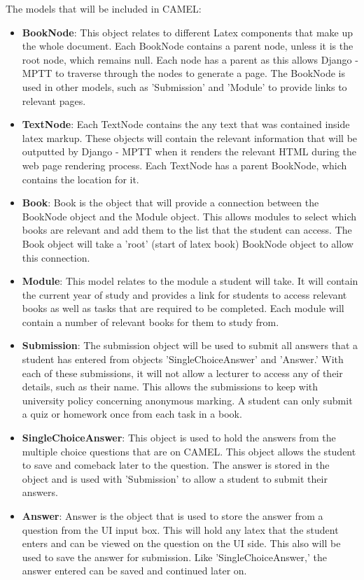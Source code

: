 	The models that will be included in CAMEL:
	\begin{itemize}
		\item \textbf{BookNode}: This object relates to different Latex components that make up the whole document. Each BookNode contains a parent node, unless it is the root node, which remains null. Each node has a parent as this allows Django - MPTT to traverse through the nodes to generate a page. The BookNode is used in other models, such as 'Submission' and 'Module' to provide links to relevant pages.     
		
		\item \textbf{TextNode}: Each TextNode contains the any text that was contained inside latex markup. These objects will contain the relevant information that will be outputted by Django - MPTT when it renders the relevant HTML during the web page rendering process. Each TextNode has a parent BookNode, which contains the location for it.  
		
		\item \textbf{Book}: Book is the object that will provide a connection between the BookNode object and the Module object. This allows modules to select which books are relevant and add them to the list that the student can access. The Book object will take a 'root' (start of latex book) BookNode object to allow this connection. 
		
		\item \textbf{Module}: This model relates to the module a student will take. It will contain the current year of study and provides a link for students to access relevant books as well as tasks that are required to be completed. Each module will contain a number of relevant books for them to study from.
		
		\item \textbf{Submission}: The submission object will be used to submit all answers that a student has entered from objects 'SingleChoiceAnswer' and 'Answer.' With each of these submissions, it will not allow a lecturer to access any of their details, such as their name. This allows the submissions to keep with university policy concerning anonymous marking. A student can only submit a quiz or homework once from each task in a book.   
		
		\item \textbf{SingleChoiceAnswer}: This object is used to hold the answers from the multiple choice questions that are on CAMEL. This object allows the student to save and comeback later to the question. The answer is stored in the object and is used with 'Submission' to allow a student to submit their answers. 
		
		\item \textbf{Answer}: Answer is the object that is used to store the answer from a question from the UI input box. This will hold any latex that the student enters and can be viewed on the question on the UI side. This also will be used to save the answer for submission. Like 'SingleChoiceAnswer,' the answer entered can be saved and continued later on. 
	\end{itemize}
	
